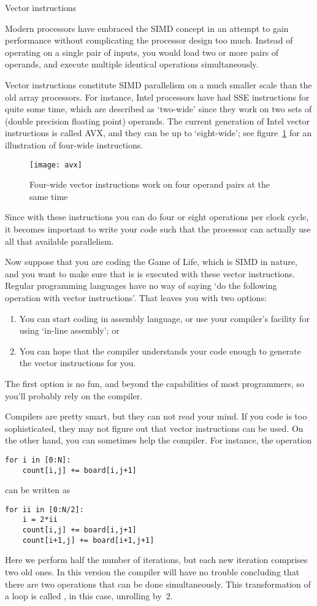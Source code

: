  {Vector instructions}
\label{sec:sse}

Modern processors have embraced the \ac{SIMD} concept in an attempt to
gain performance without complicating the processor design too much.
Instead of operating on a single pair of inputs, you would load two 
or more pairs of operands,
and execute multiple identical operations simultaneously.

Vector instructions constitute \ac{SIMD} parallelism on a much smaller
scale than the old array processors. For instance, Intel processors
have had \acf{SSE} instructions for quite some time, which are
described as `two-wide' since they work on two sets of 
(double precision floating point) operands.  The
current generation of Intel vector instructions is called \acf{AVX},
and they can be up to `eight-wide'; see figure~\ref{fig:avx}
for an illustration of four-wide instructions.
\begin{figure}[ht]
  \texttt{[image: avx]}
  \caption{Four-wide vector instructions work on four operand pairs at the same time}
  \label{fig:avx}
\end{figure}
Since with these instructions you can do four or eight operations per
clock cycle, it becomes important to write your code such that the
processor can actually use all that available parallelism.

Now suppose that you are coding the Game of Life, which is \ac{SIMD} in nature,
and you want to make sure that is is executed with these vector instructions.
Regular programming languages have no way of saying `do the following
operation with vector instructions'. That leaves you with two options:
\begin{enumerate}
\item You can start coding in assembly language, or use your
  compiler's facility for using `in-line assembly'; or
\item You can hope that the compiler understands your code enough to generate
  the vector instructions for you.
\end{enumerate}
The first option is no fun, and beyond the capabilities of most programmers,
so you'll probably rely on the compiler.

Compilers are pretty smart, but they can not read your mind. If you code is too
sophisticated, they may not figure out that vector instructions can be used.
On the other hand, you can sometimes help the compiler. For instance,
the operation
\begin{verbatim}
for i in [0:N]:
    count[i,j] += board[i,j+1]
\end{verbatim}
can be written as
\begin{verbatim}
for ii in [0:N/2]:
    i = 2*ii
    count[i,j] += board[i,j+1]
    count[i+1,j] += board[i+1,j+1]
\end{verbatim}
Here we perform half the number of iterations, but each new iteration
comprises two old ones.
In this version the compiler will have no trouble concluding
that there are two operations that can be done simultaneously. This 
transformation of a loop is
called , in this case, unrolling by~2.

